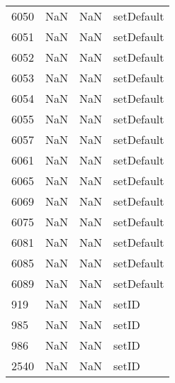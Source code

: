 \begin{tabular}{llll}
6050 &                   NaN &                        NaN &                                setDefault \\
6051 &                   NaN &                        NaN &                                setDefault \\
6052 &                   NaN &                        NaN &                                setDefault \\
6053 &                   NaN &                        NaN &                                setDefault \\
6054 &                   NaN &                        NaN &                                setDefault \\
6055 &                   NaN &                        NaN &                                setDefault \\
6057 &                   NaN &                        NaN &                                setDefault \\
6061 &                   NaN &                        NaN &                                setDefault \\
6065 &                   NaN &                        NaN &                                setDefault \\
6069 &                   NaN &                        NaN &                                setDefault \\
6075 &                   NaN &                        NaN &                                setDefault \\
6081 &                   NaN &                        NaN &                                setDefault \\
6085 &                   NaN &                        NaN &                                setDefault \\
6089 &                   NaN &                        NaN &                                setDefault \\
919  &                   NaN &                        NaN &                                     setID \\
985  &                   NaN &                        NaN &                                     setID \\
986  &                   NaN &                        NaN &                                     setID \\
2540 &                   NaN &                        NaN &                                     setID \\

\end{tabular}
